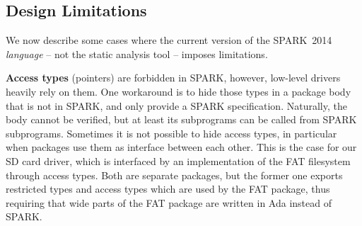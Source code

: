 

\subsection{Design Limitations}
We now describe some cases where the current version of the SPARK~2014
\emph{language} -- not the static analysis tool -- imposes limitations.


\textbf{Access types} (pointers) are forbidden in SPARK, however, low-level
drivers heavily rely on them. One workaround is to hide those types in
a package body that is not in SPARK, and only provide a SPARK specification. 
Naturally, the body cannot be verified, but at least its subprograms 
can be called from SPARK subprograms. Sometimes it
is not possible to hide access types, in particular when packages use
them as interface between each other. This is the case for our SD card
driver, which is interfaced by an implementation of the FAT filesystem through access types. Both
are separate packages, but the former one exports restricted types and
access types which are used by the FAT package, thus requiring that wide parts of the FAT package 
are written in Ada instead of SPARK.


